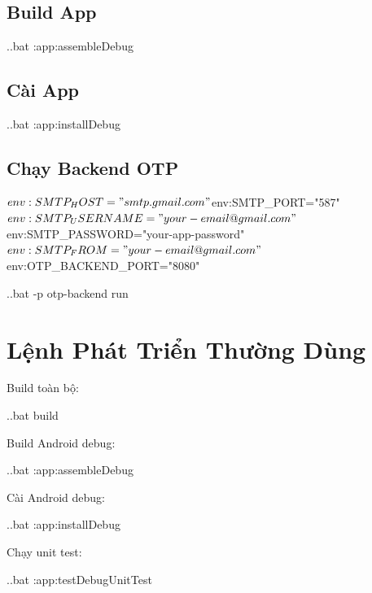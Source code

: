 \documentclass[12pt,a4paper]{report}
\begin{document}
\subsection{Build App}

\begin{CodeBlock}
.\gradlew.bat :app:assembleDebug
\end{CodeBlock}

\subsection{Cài App}

\begin{CodeBlock}
.\gradlew.bat :app:installDebug
\end{CodeBlock}

\subsection{Chạy Backend OTP}

\begin{CodeBlock}
$env:SMTP_HOST="smtp.gmail.com"
$env:SMTP_PORT="587"
$env:SMTP_USERNAME="your-email@gmail.com"
$env:SMTP_PASSWORD="your-app-password"
$env:SMTP_FROM="your-email@gmail.com"
$env:OTP_BACKEND_PORT="8080"

.\gradlew.bat -p otp-backend run
\end{CodeBlock}

\section{Lệnh Phát Triển Thường Dùng}

Build toàn bộ:

\begin{CodeBlock}
.\gradlew.bat build
\end{CodeBlock}

Build Android debug:

\begin{CodeBlock}
.\gradlew.bat :app:assembleDebug
\end{CodeBlock}

Cài Android debug:

\begin{CodeBlock}
.\gradlew.bat :app:installDebug
\end{CodeBlock}

Chạy unit test:

\begin{CodeBlock}
.\gradlew.bat :app:testDebugUnitTest
\end{CodeBlock}
\end{document}
